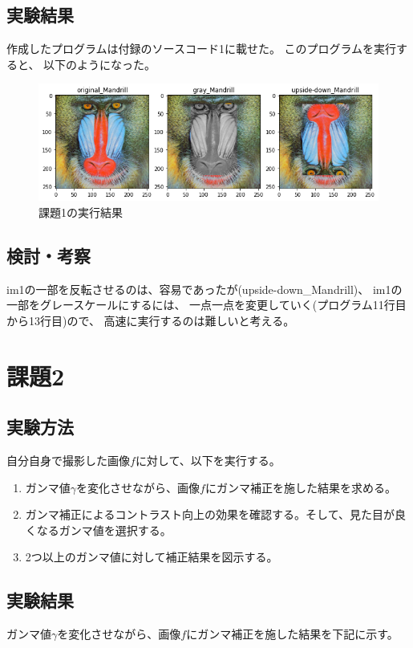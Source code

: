 \documentclass[12pt]{jarticle}
\begin{document}
\subsection{実験結果}

作成したプログラムは付録のソースコード1に載せた。
このプログラムを実行すると、
以下のようになった。

\begin{figure}[h]
    \begin{center}
        \includegraphics[scale=0.7]{kadai4_1_1.png}
    \end{center}
    \caption{課題1の実行結果}
\end{figure}

\subsection{検討・考察}

im1の一部を反転させるのは、容易であったが(upside-down\_Mandrill)、
im1の一部をグレースケールにするには、
一点一点を変更していく(プログラム11行目から13行目)ので、
高速に実行するのは難しいと考える。

\section{課題2}
\subsection{実験方法}
自分自身で撮影した画像$f$に対して、以下を実行する。
\begin{enumerate}
    \item ガンマ値$\gamma$を変化させながら、画像$f$にガンマ補正を施した結果を求める。
    \item ガンマ補正によるコントラスト向上の効果を確認する。そして、見た目が良くなるガンマ値を選択する。
    \item 2つ以上のガンマ値に対して補正結果を図示する。
\end{enumerate}

\subsection{実験結果}
ガンマ値$\gamma$を変化させながら、画像$f$にガンマ補正を施した結果を下記に示す。
\end{document}
